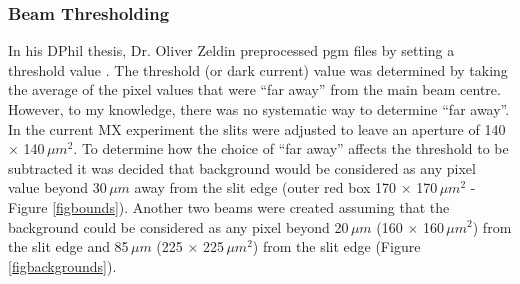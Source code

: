 \subsubsection{Beam Thresholding}
\label{secthresh}
In his DPhil thesis, Dr. Oliver Zeldin preprocessed pgm files by setting a threshold value \cite{zeldin2013thesis}.
The threshold (or dark current) value was determined by taking the average of the pixel values that were ``far away'' from the main beam centre.
However, to my knowledge, there was no systematic way to determine ``far away''.
In the current MX experiment the slits were adjusted to leave an aperture of 140 $\times$ 140$\, \mu m^{\text{2}}$.
To determine how the choice of ``far away'' affects the threshold to be subtracted it was decided that background would be considered as any pixel value beyond 30$\,\mu m$ away from the slit edge (outer red box 170 $\times$ 170$\, \mu m^{\text{2}}$ - Figure \ref{figbounds}).
Another two beams were created assuming that the background could be considered as any pixel beyond 20$\,\mu m$ (160 $\times$ 160$\, \mu m^{\text{2}}$) from the slit edge and 85$\,\mu m$ (225 $\times$ 225$\, \mu m^{\text{2}}$) from the slit edge (Figure \ref{figbackgrounds}).
